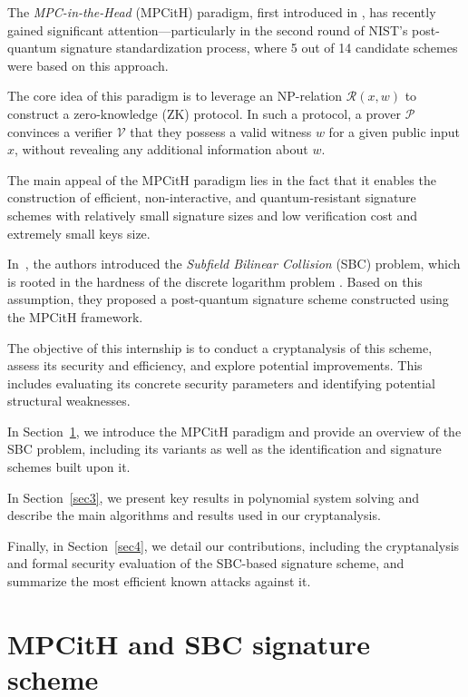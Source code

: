\documentclass[english]{article}
\begin{document}
		The \emph{MPC-in-the-Head} (MPCitH) paradigm, first introduced in \cite{IKOS07}, has recently gained significant attention—particularly in the second round of NIST’s post-quantum signature standardization process, where 5 out of 14 candidate schemes were based on this approach.
		
		The core idea of this paradigm is to leverage an NP-relation $\mathcal{R}(x, w)$ to construct a zero-knowledge (ZK) protocol. In such a protocol, a prover $\mathcal{P}$ convinces a verifier $\mathcal{V}$ that they possess a valid witness $w$ for a given public input $x$, without revealing any additional information about $w$.
		
		The main appeal of the MPCitH paradigm lies in the fact that it enables the construction of efficient, non-interactive, and quantum-resistant signature schemes with relatively small signature sizes and low verification cost and extremely small keys size.
		
		In~\cite{HJ23}, the authors introduced the \emph{Subfield Bilinear Collision} (SBC) problem, which is rooted in the hardness of the discrete logarithm problem \cite{Joux13}. Based on this assumption, they proposed a post-quantum signature scheme constructed using the MPCitH framework.
		
		The objective of this internship is to conduct a cryptanalysis of this scheme, assess its security and efficiency, and explore potential improvements.
		This includes evaluating its concrete security parameters and identifying potential structural weaknesses.
		
		In Section~\ref{sec2}, we introduce the MPCitH paradigm and provide an overview of the SBC problem, including its variants as well as the identification and signature schemes built upon it. 
		
		In Section~\ref{sec3}, we present key results in polynomial system solving and describe the main algorithms and results used in our cryptanalysis.
		
		Finally, in Section~\ref{sec4}, we detail our contributions, including the cryptanalysis and formal security evaluation of the SBC-based signature scheme, and summarize the most efficient known attacks against it.
	
	\newpage
	\tableofcontents
	\newpage
	\section{MPCitH and SBC signature scheme}\label{sec2}
		
\end{document}
